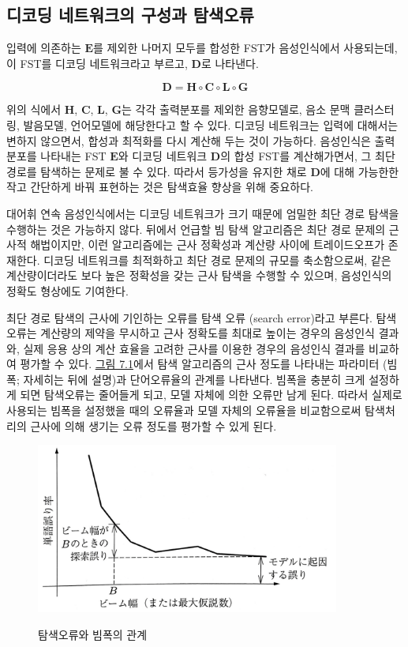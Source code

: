 \documentclass[../main.tex]{subfiles}
\begin{document}
\subsection{디코딩 네트워크의 구성과 탐색오류}

입력에 의존하는 $\bm{E}$를 제외한 나머지 모두를 합성한 FST가 음성인식에서 사용되는데, 이 FST를 디코딩 네트워크라고 부르고, $\bm{D}$로 나타낸다. 

\begin{equation}\label{eq:7_2}
    \bm{D} = \bm{H} \circ \bm{C} \circ \bm{L} \circ \bm{G}
\end{equation}

위의 식에서 $\bm{H}$, $\bm{C}$, $\bm{L}$, $\bm{G}$는 각각 출력분포를 제외한 음향모델로, 음소 문맥 클러스터링, 발음모델, 언어모델에 해당한다고 할 수 있다. 
디코딩 네트워크는 입력에 대해서는 변하지 않으면서, 합성과 최적화를 다시 계산해 두는 것이 가능하다. 
음성인식은 출력분포를 나타내는 FST $\bm{E}$와 디코딩 네트워크 $\bm{D}$의 합성 FST를 계산해가면서, 그 최단 경로를 탐색하는 문제로 불 수 있다. 
따라서 등가성을 유지한 채로 $\bm{D}$에 대해 가능한한 작고 간단하게 바꿔 표현하는 것은 탐색효율 향상을 위해 중요하다. 

대어휘 연속 음성인식에서는 디코딩 네트워크가 크기 때문에 엄밀한 최단 경로 탐색을 수행하는 것은 가능하지 않다. 
뒤에서 언급할 빔 탐색 알고리즘은 최단 경로 문제의 근사적 해법이지만, 이런 알고리즘에는 근사 정확성과 계산량 사이에 트레이드오프가 존재한다. 
디코딩 네트워크를 최적화하고 최단 경로 문제의 규모를 축소함으로써, 같은 계산량이더라도 보다 높은 정확성을 갖는 근사 탐색을 수행할 수 있으며, 음성인식의 정확도 형상에도 기여한다. 

최단 경로 탐색의 근사에 기인하는 오류를 탐색 오류 (search error)라고 부른다. 
탐색 오류는 계산량의 제약을 무시하고 근사 정확도를 최대로 높이는 경우의 음성인식 결과와, 실제 응용 상의 계산 효율을 고려한 근사를 이용한 경우의 음성인식 결과를 비교하여 평가할 수 있다. 
\hyperref[fig:7_1]{그림 7.1}에서 탐색 알고리즘의 근사 정도를 나타내는 파라미터 (빔폭; 자세히는 뒤에 설명)과 단어오류율의 관계를 나타낸다. 
빔폭을 충분히 크게 설정하게 되면 탐색오류는 줄어들게 되고, 모델 자체에 의한 오류만 남게 된다. 
따라서 실제로 사용되는 빔폭을 설정했을 때의 오류율과 모델 자체의 오류율을 비교함으로써 탐색처리의 근사에 의해 생기는 오류 정도를 평가할 수 있게 된다. 

\begin{figure}[h]
    \centering
    \includegraphics[width=10cm]{../figures/fig7_1_orig}\label{fig:7_1}
    \caption{탐색오류와 빔폭의 관계}
\end{figure}
\end{document}
